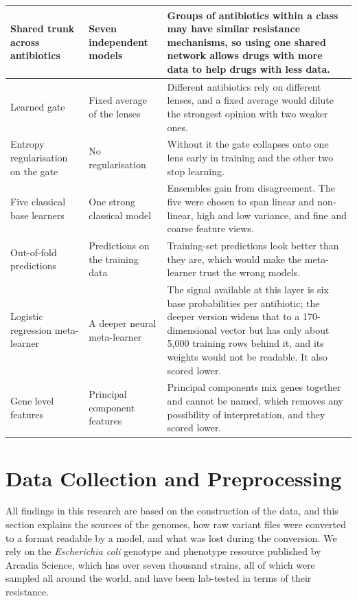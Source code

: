 {\begin{longtable}{|>{\raggedright\arraybackslash}p{2.9cm}|>{\raggedright\arraybackslash}p{3.1cm}|>{\raggedright\arraybackslash}p{7.5cm}|}
Shared trunk across antibiotics & Seven independent models &
Groups of antibiotics within a class may have similar resistance mechanisms, so using one
shared network allows drugs with more data to help drugs with less data. \\ \hline
Learned gate & Fixed average of the lenses &
Different antibiotics rely on different lenses, and a fixed average would dilute the
strongest opinion with two weaker ones. \\ \hline
Entropy regularisation on the gate & No regularisation &
Without it the gate collapses onto one lens early in training and the other two stop
learning. \\ \hline
Five classical base learners & One strong classical model &
Ensembles gain from disagreement. The five were chosen to span linear and non-linear, high
and low variance, and fine and coarse feature views. \\ \hline
Out-of-fold predictions & Predictions on the training data &
Training-set predictions look better than they are, which would make the meta-learner trust
the wrong models. \\ \hline
Logistic regression meta-learner & A deeper neural meta-learner &
The signal available at this layer is six base probabilities per antibiotic; the deeper
version widens that to a 170-dimensional vector but has only about 5{,}000 training rows
behind it, and its weights would not be readable. It also scored lower. \\ \hline
Gene level features & Principal component features &
Principal components mix genes together and cannot be named, which removes any possibility
of interpretation, and they scored lower. \\ \hline
\end{longtable}}



\FloatBarrier
\section{Data Collection and Preprocessing}
\label{sec:data}

All findings in this research are based on the construction of the data, and this section
explains the sources of the genomes, how raw variant files were converted to a format readable
by a model, and what was lost during the conversion. We rely on the \textit{Escherichia coli}
genotype and phenotype resource published by Arcadia Science, which has over seven thousand
strains, all of which were sampled all around the world, and have been lab-tested in terms of
their resistance.

